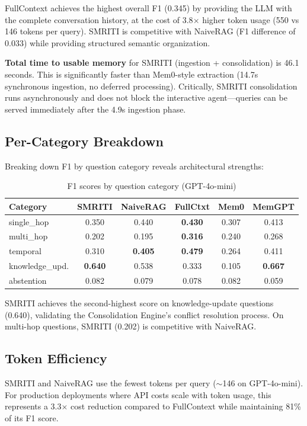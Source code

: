 \documentclass[conference]{IEEEtran}
\begin{document}
FullContext achieves the highest overall F1 (0.345) by providing the LLM with the complete conversation history, at the cost of 3.8$\times$ higher token usage (550 vs 146 tokens per query). SMRITI is competitive with NaiveRAG (F1 difference of 0.033) while providing structured semantic organization.

\textbf{Total time to usable memory} for SMRITI (ingestion + consolidation) is 46.1 seconds. This is significantly faster than Mem0-style extraction (14.7s synchronous ingestion, no deferred processing). Critically, SMRITI consolidation runs asynchronously and does not block the interactive agent---queries can be served immediately after the 4.9s ingestion phase.

\subsection{Per-Category Breakdown}
Breaking down F1 by question category reveals architectural strengths:

\begin{table}[ht]
\caption{F1 scores by question category (GPT-4o-mini)}
\label{tab:categories}
\begin{center}
\begin{tabular}{lccccc}
\toprule
\textbf{Category} & \textbf{SMRITI} & \textbf{NaiveRAG} & \textbf{FullCtxt} & \textbf{Mem0} & \textbf{MemGPT} \\
\midrule
single\_hop & 0.350 & 0.440 & \textbf{0.430} & 0.307 & 0.413 \\
multi\_hop & 0.202 & 0.195 & \textbf{0.316} & 0.240 & 0.268 \\
temporal & 0.310 & \textbf{0.405} & \textbf{0.479} & 0.264 & 0.411 \\
knowledge\_upd. & \textbf{0.640} & 0.538 & 0.333 & 0.105 & \textbf{0.667} \\
abstention & 0.082 & 0.079 & 0.078 & 0.082 & 0.059 \\
\bottomrule
\end{tabular}
\end{center}
\end{table}

SMRITI achieves the second-highest score on knowledge-update questions (0.640), validating the Consolidation Engine's conflict resolution process. On multi-hop questions, SMRITI (0.202) is competitive with NaiveRAG.

\subsection{Token Efficiency}
SMRITI and NaiveRAG use the fewest tokens per query ($\sim$146 on GPT-4o-mini). For production deployments where API costs scale with token usage, this represents a 3.3$\times$ cost reduction compared to FullContext while maintaining 81\% of its F1 score.
\end{document}
